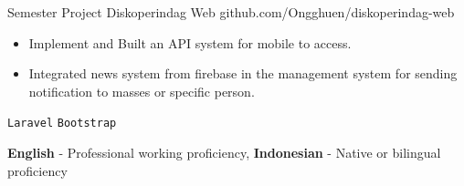 \documentclass[9pt]{developercv} %
\begin{document}
\begin{entrylist}
{	}
	\entry
	{Semester Project}
	{Diskoperindag Web}
	{github.com/Ongghuen/diskoperindag-web}
	{\vspace{-10 pt}
		\begin{itemize}[noitemsep,topsep=0pt,parsep=0pt,partopsep=0pt, leftmargin=-1pt]
			\item Implement and Built an API system for mobile to access.
			\item Integrated news system from firebase in the management system for sending notification to masses or specific person.
		\end{itemize}
		\texttt{Laravel} \slashsep \texttt{Bootstrap}}
\end{entrylist}

\vspace{-10 pt}
\vspace{-6pt}

\hspace{26mm} \textbf{English} - Professional working proficiency, \textbf{ Indonesian} - Native or bilingual proficiency
\end{document}

